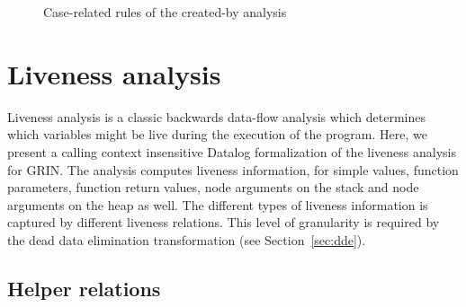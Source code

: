 \documentclass[main.tex]{subfiles}
\begin{document}
\begin{figure}[h]
  \caption{Case-related rules of the created-by analysis}
  \label{fig:cby-case}
  \end{figure}

  \section{Liveness analysis} \label{sec:lva}

	Liveness analysis is a classic backwards data-flow analysis which determines which variables might be live during the execution of the program. Here, we present a calling context insensitive Datalog formalization of the liveness analysis for GRIN. The analysis computes liveness information, for simple values, function parameters, function return values, node arguments on the stack and node arguments on the heap as well. The different types of liveness information is captured by different liveness relations. This level of granularity is required by the dead data elimination transformation (see Section~\ref{sec:dde}).
	
	\subsection{Helper relations}
	
\end{document}
